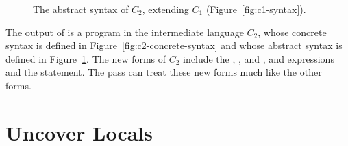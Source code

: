 \documentclass[11pt]{book}
\newcommand{\gray}[1]{{\color{gray} #1}}
\begin{document}
\begin{figure}[tp]
\fbox{
  \begin{minipage}{0.96\textwidth}
    \small
\[
\begin{array}{lcl}
\Atm &::=& \gray{ \INT{\Int} \mid \VAR{\Var} \mid \BOOL{\itm{bool}} }\\
\itm{cmp} &::= & \gray{  \key{eq?} \mid \key{<} } \\
\Exp &::= & \gray{ \Atm \mid \READ{} } \\
   &\mid& \gray{ \NEG{\Atm} \mid \ADD{\Atm}{\Atm} }\\
   &\mid& \gray{ \UNIOP{\key{not}}{\Atm} \mid \BINOP{\itm{cmp}}{\Atm}{\Atm}  } \\
   &\mid& (\key{Allocate} \,\itm{int}\,\itm{type}) \\
   &\mid& \BINOP{\key{'vector-ref}}{\Atm}{\INT{\Int}}  \\
   &\mid& (\key{Prim}~\key{'vector-set!}\,(\key{list}\,\Atm\,\INT{\Int}\,\Atm))\\
   &\mid& (\key{GlobalValue} \,\Var) \mid (\key{Void})\\
\Stmt &::=& \gray{ \ASSIGN{\VAR{\Var}}{\Exp} } 
       \mid (\key{Collect} \,\itm{int}) \\
\Tail &::= & \gray{ \RETURN{\Exp} \mid \SEQ{\Stmt}{\Tail} 
       \mid \GOTO{\itm{label}} } \\
      &\mid& \gray{ \IFSTMT{\BINOP{\itm{cmp}}{\Atm}{\Atm}}{\GOTO{\itm{label}}}{\GOTO{\itm{label}}}  }\\
C_2 & ::= & \gray{ \PROGRAM{\itm{info}}{\CFG{(\itm{label}\,\key{.}\,\Tail)\ldots}} }
\end{array}
\]
\end{minipage}
}
\caption{The abstract syntax of $C_2$, extending $C_1$
   (Figure~\ref{fig:c1-syntax}).}
\label{fig:c2-syntax}
\end{figure}

The output of  is a program in the
intermediate language $C_2$, whose concrete syntax is defined in
Figure~\ref{fig:c2-concrete-syntax} and whose abstract syntax is
defined in Figure~\ref{fig:c2-syntax}.  The new forms of $C_2$ include
the , , and , and
 expressions and the  statement.  The
 pass can treat these new forms much like the
other forms.


\section{Uncover Locals}
\label{sec:uncover-locals-r3}
\end{document}
